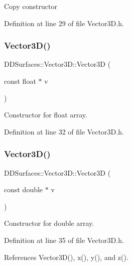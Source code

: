 Copy constructor 

Definition at line 29 of file Vector3\+D.\+h.

\hypertarget{class_d_d_surfaces_1_1_vector3_d_a66b1e2e00762d97d32977463936965aa}{}\label{class_d_d_surfaces_1_1_vector3_d_a66b1e2e00762d97d32977463936965aa} 
\subsubsection{\texorpdfstring{Vector3\+D()}{Vector3D()}\hspace{0.1cm}{\footnotesize\ttfamily [3/6]}}
{\footnotesize\ttfamily D\+D\+Surfaces\+::\+Vector3\+D\+::\+Vector3D (\begin{DoxyParamCaption}\item[{const float $\ast$}]{v }\end{DoxyParamCaption})\hspace{0.3cm}{\ttfamily [inline]}}

Constructor for float array. 

Definition at line 32 of file Vector3\+D.\+h.

\hypertarget{class_d_d_surfaces_1_1_vector3_d_a2f148efd6032e40a105962cd7c4aed78}{}\label{class_d_d_surfaces_1_1_vector3_d_a2f148efd6032e40a105962cd7c4aed78} 
\subsubsection{\texorpdfstring{Vector3\+D()}{Vector3D()}\hspace{0.1cm}{\footnotesize\ttfamily [4/6]}}
{\footnotesize\ttfamily D\+D\+Surfaces\+::\+Vector3\+D\+::\+Vector3D (\begin{DoxyParamCaption}\item[{const double $\ast$}]{v }\end{DoxyParamCaption})\hspace{0.3cm}{\ttfamily [inline]}}

Constructor for double array. 

Definition at line 35 of file Vector3\+D.\+h.



References Vector3\+D(), x(), y(), and z().

